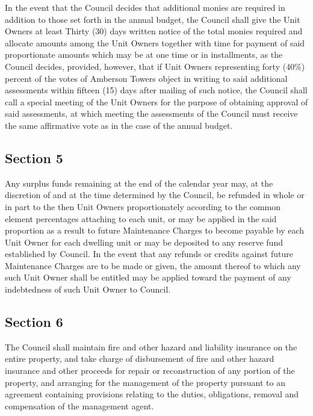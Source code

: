 \documentclass[
]{book}
\begin{document}
In the event that the Council decides that additional monies are required in addition to those set forth in the annual budget, the Council shall give the Unit Owners at least Thirty (30) days written notice of the total monies required and allocate amounts among the Unit Owners together with time for payment of said proportionate amounts which may be at one time or in installments, as the Council decides, provided, however, that if Unit Owners representing forty (40\%) percent of the votes of Amberson Towers object in writing to said additional assessments within fifteen (15) days after mailing of such notice, the Council shall call a special meeting of the Unit Owners for the purpose of obtaining approval of said assessments, at which meeting the assessments of the Council must receive the same affirmative vote as in the case of the annual budget.

\hypertarget{section-5-3}{%
\subsection*{Section 5}\label{section-5-3}}

Any surplus funds remaining at the end of the calendar year may, at the discretion of and at the time determined by the Council, be refunded in whole or in part to the then Unit Owners proportionately according to the common element percentages attaching to each unit, or may be applied in the said proportion as a result to future Maintenance Charges to become payable by each Unit Owner for each dwelling unit or may be deposited to any reserve fund established by Council. In the event that any refunds or credits against future Maintenance Charges are to be made or given, the amount thereof to which any such Unit Owner shall be entitled may be applied toward the payment of any indebtedness of such Unit Owner to Council.

\hypertarget{section-6-3}{%
\subsection*{Section 6}\label{section-6-3}}

The Council shall maintain fire and other hazard and liability insurance on the entire property, and take charge of disbursement of fire and other hazard insurance and other proceeds for repair or reconstruction of any portion of the property, and arranging for the management of the property pursuant to an agreement containing provisions relating to the duties, obligations, removal and compensation of the management agent.
\end{document}

